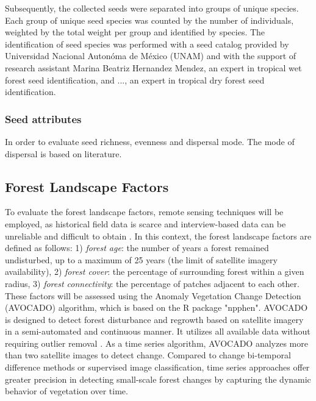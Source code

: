 Subsequently, the collected seeds were separated into groups of unique species. Each group of unique seed species  was counted by the number of individuals, weighted by the total weight per group and identified by species. The identification of seed species was performed with a seed catalog provided by Universidad Nacional Autonóma de México (UNAM) and with the support of research assistant Marina Beatriz Hernandez Mendez, an expert in tropical wet forest seed identification, and ..., an expert in tropical dry forest seed identification. 

\subsubsection{Seed attributes}
In order to evaluate seed richness, evenness and dispersal mode. The mode of dispersal is based on literature.


\subsection{Forest Landscape Factors}
To evaluate the forest landscape factors, remote sensing techniques will be employed, as historical field data is scarce and interview-based data can be unreliable and difficult to obtain \citep{decuyperContinuousMonitoringForest2022}. In this context, the forest landscape factors are defined as follows: 1) \textit{forest age}: the number of years a forest remained undisturbed, up to a maximum of 25 years (the limit of satellite imagery availability), 2) \textit{forest cover}: the percentage of surrounding forest within a given radius, 3) \textit{forest connectivity}: the percentage of patches adjacent to each other. 
These factors will be assessed using the Anomaly Vegetation Change Detection (AVOCADO) algorithm, which is based on the R package "npphen". AVOCADO is designed to detect forest disturbance and regrowth based on satellite imagery in a semi-automated and continuous manner. It utilizes all available data without requiring outlier removal \citep{decuyperContinuousMonitoringForest2022}. As a time series algorithm, AVOCADO analyzes more than two satellite images to detect change. Compared to change bi-temporal difference methods or supervised image classification, time series approaches offer greater precision in detecting small-scale forest changes by capturing the dynamic behavior of vegetation over time. 

